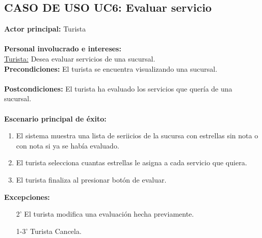 \documentclass[11pt]{article}
\begin{document}
\subsection*{\textbf{CASO DE USO UC6:} Evaluar servicio }
\textbf{Actor principal:} Turista\\
\\
\textbf{Personal involucrado e intereses: }\\\underline{Turista:} Desea evaluar servicios de una sucursal.
\\
\textbf{Precondiciones:} El turista se encuentra visualizando una sucursal.\\
\\
\textbf{Postcondiciones:} El turista ha evaluado los servicios que quería de una sucursal.\\
\\
\textbf{Escenario principal de éxito:}
\begin{enumerate}
\item El sistema muestra una lista de seriicios de la sucursa con estrellas sin nota o con nota si ya se había evaluado.
\item El turista selecciona cuantas estrellas le asigna a cada servicio que quiera.
\item El turista finaliza al presionar botón de evaluar.
\end{enumerate}
\textbf{Excepciones:}
\begin{enumerate}
\item[2'] El turista modifica una evaluación hecha previamente.
\item[1-3'] Turista Cancela.
\end{enumerate}
\end{document}
